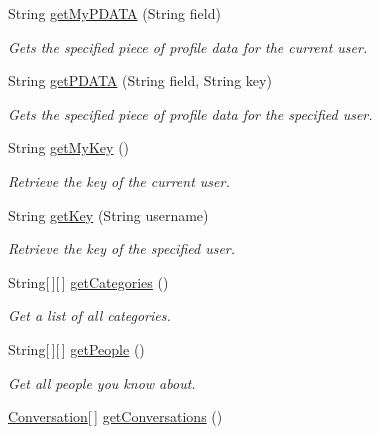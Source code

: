 \begin{DoxyCompactItemize}
String \hyperlink{classballmerpeak_1_1turtlenet_1_1server_1_1TurtlenetImpl_acc52a5b5a58896bf97348ccd506acb5c}{get\-My\-P\-D\-A\-T\-A} (String field)
\begin{DoxyCompactList}\small\item\em Gets the specified piece of profile data for the current user. \end{DoxyCompactList}\item 
String \hyperlink{classballmerpeak_1_1turtlenet_1_1server_1_1TurtlenetImpl_a2488f315ab0410704181e88c19e74b8c}{get\-P\-D\-A\-T\-A} (String field, String key)
\begin{DoxyCompactList}\small\item\em Gets the specified piece of profile data for the specified user. \end{DoxyCompactList}\item 
String \hyperlink{classballmerpeak_1_1turtlenet_1_1server_1_1TurtlenetImpl_a9c718d4f71c51932d61f308049f1f99d}{get\-My\-Key} ()
\begin{DoxyCompactList}\small\item\em Retrieve the key of the current user. \end{DoxyCompactList}\item 
String \hyperlink{classballmerpeak_1_1turtlenet_1_1server_1_1TurtlenetImpl_a780b106db510694aaa9156d47c09ab05}{get\-Key} (String username)
\begin{DoxyCompactList}\small\item\em Retrieve the key of the specified user. \end{DoxyCompactList}\item 
String\mbox{[}$\,$\mbox{]}\mbox{[}$\,$\mbox{]} \hyperlink{classballmerpeak_1_1turtlenet_1_1server_1_1TurtlenetImpl_aa1c659a0e4d6d60761b3f324cbe7bd8c}{get\-Categories} ()
\begin{DoxyCompactList}\small\item\em Get a list of all categories. \end{DoxyCompactList}\item 
String\mbox{[}$\,$\mbox{]}\mbox{[}$\,$\mbox{]} \hyperlink{classballmerpeak_1_1turtlenet_1_1server_1_1TurtlenetImpl_a5c033785fd6e598229c23c5c08b805ba}{get\-People} ()
\begin{DoxyCompactList}\small\item\em Get all people you know about. \end{DoxyCompactList}\item 
\hyperlink{classballmerpeak_1_1turtlenet_1_1shared_1_1Conversation}{Conversation}\mbox{[}$\,$\mbox{]} \hyperlink{classballmerpeak_1_1turtlenet_1_1server_1_1TurtlenetImpl_a3b7c5b806f0a79198d3042964bf614c1}{get\-Conversations} ()

\end{DoxyCompactItemize}
